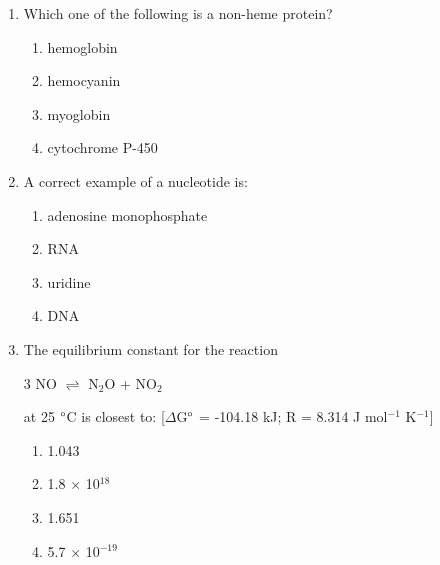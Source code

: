 \documentclass[journal,12pt,onecolumn]{IEEEtran}
\begin{document}
\begin{enumerate}
    \item Which one of the following is a non-heme protein?
    \begin{multicols}{2}
    \begin{enumerate}
        \item hemoglobin
        \item hemocyanin
        \item myoglobin
        \item cytochrome P-450
    \end{enumerate}
    \end{multicols}
    \hfill{}
    
    \item A correct example of a nucleotide is:
    \begin{multicols}{2}
    \begin{enumerate}
        \item adenosine monophosphate 
        \item RNA
        \item uridine
        \item DNA
    \end{enumerate}
    \end{multicols}
    \hfill{}
     \item The equilibrium constant for the reaction
    \begin{center}
        3 NO  $\rightleftharpoons$ N$_2$O  + NO$_2$ 
    \end{center}
    at 25 $\degree$C is closest to: [$\Delta$G$\degree$ = -104.18 kJ; R = 8.314 J mol$^{-1}$ K$^{-1}$]
    \begin{multicols}{2}
    \begin{enumerate}
        \item 1.043
        \item 1.8 $\times$ 10$^{18}$
        \item 1.651
        \item 5.7 $\times$ 10$^{-19}$
    \end{enumerate}
    \end{multicols}
    \hfill{}


\end{enumerate}
\end{document}
